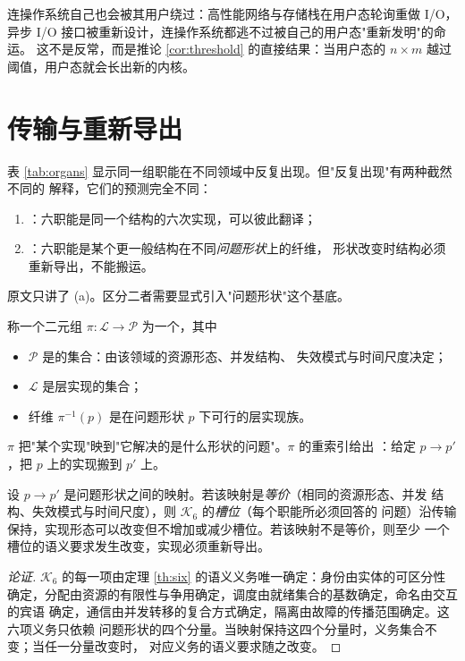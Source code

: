 连操作系统自己也会被其用户绕过：高性能网络与存储栈在用户态轮询重做
I/O，异步 I/O 接口被重新设计，连操作系统都逃不过被自己的用户态"重新发明"的命运。
这不是反常，而是推论 \ref{cor:threshold} 的直接结果：当用户态的 $n \times m$ 越过
阈值，用户态就会长出新的内核。

\section{传输与重新导出}\label{sec:transport}

表 \ref{tab:organs} 显示同一组职能在不同领域中反复出现。但"反复出现"有两种截然不同的
解释，它们的预测完全不同：

\begin{enumerate}[label=(\alph*)]
\item {}：六职能是同一个结构的六次实现，可以彼此翻译；
\item {}：六职能是某个更一般结构在不同\emph{问题形状}上的纤维，
      形状改变时结构必须重新导出，不能搬运。
\end{enumerate}

原文只讲了 (a)。区分二者需要显式引入"问题形状"这个基底。

\begin{definition}[问题形状与层族]\label{def:fibration}
称一个二元组 $\pi : \mathcal{L} \to \mathcal{P}$ 为一个，其中
\begin{itemize}
\item $\mathcal{P}$ 是的集合：由该领域的资源形态、并发结构、
      失效模式与时间尺度决定；
\item $\mathcal{L}$ 是层实现的集合；
\item 纤维 $\pi^{-1}(p)$ 是在问题形状 $p$ 下可行的层实现族。
\end{itemize}
$\pi$ 把"某个实现"映到"它解决的是什么形状的问题"。$\pi$ 的重索引给出
：给定 $p \to p'$，把 $p$ 上的实现搬到 $p'$ 上。
\end{definition}

\begin{proposition}[传输的保持范围]\label{prop:transport}
设 $p \to p'$ 是问题形状之间的映射。若该映射是\emph{等价}（相同的资源形态、并发
结构、失效模式与时间尺度），则 $\mathcal{K}_6$ 的\emph{槽位}（每个职能所必须回答的
问题）沿传输保持，实现形态可以改变但不增加或减少槽位。若该映射不是等价，则至少
一个槽位的语义要求发生改变，实现必须重新导出。
\end{proposition}

\begin{proof}[论证]
$\mathcal{K}_6$ 的每一项由定理 \ref{th:six} 的语义义务唯一确定：身份由实体的可区分性
确定，分配由资源的有限性与争用确定，调度由就绪集合的基数确定，命名由交互的宾语
确定，通信由并发转移的复合方式确定，隔离由故障的传播范围确定。这六项义务只依赖
问题形状的四个分量。当映射保持这四个分量时，义务集合不变；当任一分量改变时，
对应义务的语义要求随之改变。
\end{proof}

